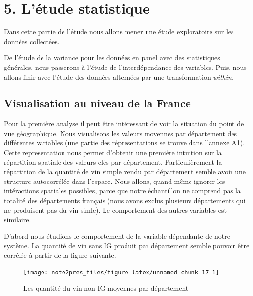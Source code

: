\documentclass[11pt,]{article}
\begin{document}
\hypertarget{letude-statistique}{%
\section{5. L'étude statistique}\label{letude-statistique}}

Dans cette partie de l'étude nous allons mener une étude exploratoire
sur les données collectées.

De l'étude de la variance pour les données en panel avec des
statistiques générales, nous passerons à l'étude de l'interdépendance
des variables. Puis, nous allons finir avec l'étude des données
alternées par une transformation \emph{within}.

\hypertarget{visualisation-au-niveau-de-la-france}{%
\subsection{Visualisation au niveau de la
France}\label{visualisation-au-niveau-de-la-france}}

Pour la première analyse il peut être intéressant de voir la situation
du point de vue géographique. Nous visualisons les valeurs moyennes par
département des différentes variables (une partie des répresentations se
trouve dans l'annexe A1). Cette representation nous permet d'obtenir une
première intuition sur la répartition spatiale des valeurs clés par
département. Particulièrement la répartition de la quantité de vin
simple vendu par département semble avoir une structure autocorrélée
dans l'espace. Nous allons, quand même ignorer les intéractions
spatiales possibles, parce que notre échantillon ne comprend pas la
totalité des départements français (nous avons exclus plusieurs
départements qui ne produisent pas du vin simle). Le comportement des
autres variables est similaire.

D'abord nous étudions le comportement de la variable dépendante de notre
système. La quantité de vin sans IG produit par département semble
pouvoir être corrélée à partir de la figure suivante.

\FloatBarrier

\begin{figure}[!htbp]

{\centering \texttt{[image: note2pres\_files/figure-latex/unnamed-chunk-17-1]} 

}

\caption{Les quantité du vin non-IG moyennes par département}\label{fig:unnamed-chunk-17}
\end{figure}
\end{document}
